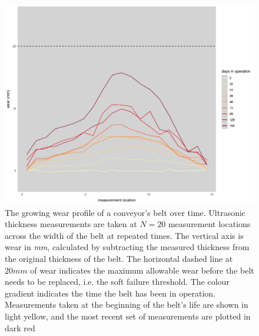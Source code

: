 \begin{figure}
  \centering
  \includegraphics[width=\textwidth]{figures/ch-6/main_belt.pdf}
  \caption{The growing wear profile of a conveyor's belt over time. Ultrasonic thickness measurements are taken at $N = 20$ measurement locations across the width of the belt at repeated times. The vertical axis is wear in \textit{mm}, calculated by subtracting the measured thickness from the original thickness of the belt. The horizontal dashed line at $20mm$ of wear indicates the maximum allowable wear before the belt needs to be replaced, i.e. the soft failure threshold. The colour gradient indicates the time the belt has been in operation. Measurements taken at the beginning of the belt's life are shown in light yellow, and the most recent set of measurements are plotted in dark red}
  \label{fig:ut-example}
\end{figure}

